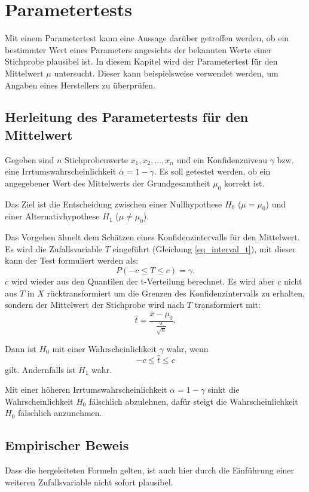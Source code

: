 \documentclass[10pt,twocolumn]{scrartcl}
\begin{document}
\section{Parametertests}
		Mit einem Parametertest kann eine Aussage darüber getroffen werden, ob ein bestimmter Wert eines Parameters angesichts der bekannten Werte einer Stichprobe plausibel ist. In diesem Kapitel wird der Parametertest für den Mittelwert $\mu$ untersucht. Dieser kann beispielsweise verwendet werden, um Angaben eines Herstellers zu überprüfen.
	\subsection{Herleitung des Parametertests für den Mittelwert}
		Gegeben sind $n$ Stichprobenwerte $x_1, x_2, ..., x_n$ und ein Konfidenzniveau $\gamma$ bzw. eine Irrtumswahrscheinlichkeit $\alpha = 1 - \gamma$. Es soll getestet werden, ob ein angegebener Wert des Mittelwerts der Grundgesamtheit $\mu_0$ korrekt ist.

		Das Ziel ist die Entscheidung zwischen einer Nullhypothese $H_0$ ($\mu = \mu_0$) und einer Alternativhypothese $H_1$ ($\mu \ne \mu_0$).

		Das Vorgehen ähnelt dem Schätzen eines Konfidenzintervalls für den Mittelwert. Es wird die Zufallsvariable $T$ eingeführt (Gleichung \ref{eq_interval_t}), mit dieser kann der Test formuliert werden als:
		\begin{equation}
		P(-c \le T \le c) = \gamma .
		\end{equation}
		$c$ wird wieder aus den Quantilen der t-Verteilung berechnet. Es wird aber $c$ nicht aus $T$ in $X$ rücktransformiert um die Grenzen des Konfidenzintervalls zu erhalten, sondern der Mittelwert der Stichprobe wird nach $T$ transformiert mit:
		\begin{equation}
		\hat{t} = \frac{\overline{x} - \mu_0}{\frac{s}{\sqrt{n}}} .
		\end{equation}

		Dann ist $H_0$ mit einer Wahrscheinlichkeit $\gamma$ wahr, wenn
		\begin{equation}
		-c \le \hat{t} \le c
		\end{equation}
		gilt. Andernfalls ist $H_1$ wahr.

		Mit einer höheren Irrtumswahrscheinlichkeit $\alpha = 1 - \gamma$ sinkt die Wahrscheinlichkeit $H_0$ fälschlich abzulehnen, dafür steigt die Wahrscheinlichkeit $H_0$ fälschlich anzunehmen.
	\subsection{Empirischer Beweis}
		Dass die hergeleiteten Formeln gelten, ist auch hier durch die Einführung einer weiteren Zufallsvariable nicht sofort plausibel.
\end{document}
